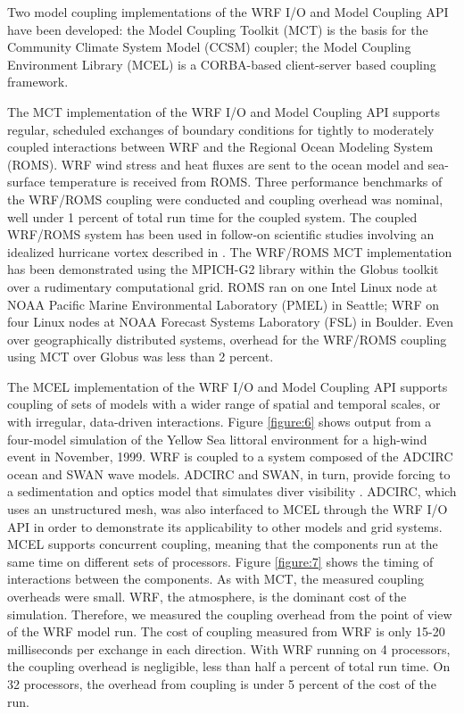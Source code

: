 Two model coupling implementations of the WRF I/O and Model Coupling
API have been developed: the Model Coupling Toolkit (MCT)
\citep{larson01} is the basis for the Community Climate System Model
(CCSM) coupler; the Model Coupling Environment Library (MCEL)
\citep{bettencourt02} is a CORBA-based client-server based coupling
framework.

The MCT implementation of the WRF I/O and Model Coupling API supports
regular, scheduled exchanges of boundary conditions for tightly to
moderately coupled interactions between WRF and the Regional Ocean
Modeling System (ROMS).  WRF wind stress and heat fluxes are sent to
the ocean model and sea-surface temperature is received from ROMS.
Three performance benchmarks of the WRF/ROMS coupling were conducted
and coupling overhead was nominal, well under 1 percent of total run
time for the coupled system. The coupled WRF/ROMS system has been used
in follow-on scientific studies involving an idealized hurricane vortex
described in \citet{nolan02}. The WRF/ROMS MCT implementation has been
demonstrated using the MPICH-G2 library within the Globus toolkit over
a rudimentary computational grid.  ROMS ran on one Intel Linux node at
NOAA Pacific Marine Environmental Laboratory (PMEL) in Seattle; WRF on
four Linux nodes at NOAA Forecast Systems Laboratory (FSL) in Boulder.
Even over geographically distributed systems, overhead for the WRF/ROMS
coupling using MCT over Globus was less than 2 percent.

The MCEL implementation of the WRF I/O and Model Coupling API supports
coupling of sets of models with a wider range of spatial and temporal
scales, or with irregular, data-driven interactions. Figure
\ref{figure:6} shows output from a four-model simulation of the Yellow
Sea littoral environment for a high-wind event in November, 1999. WRF
is coupled to a system composed of the ADCIRC ocean and SWAN wave
models.  ADCIRC and SWAN, in turn, provide forcing to a sedimentation
and optics model that simulates diver visibility \citep{allard02}.
ADCIRC, which uses an unstructured mesh, was also interfaced to MCEL
through the WRF I/O API in order to demonstrate its applicability to
other models and grid systems. MCEL supports concurrent coupling,
meaning that the components run at the same time on different sets of
processors.  Figure \ref{figure:7} shows the timing of interactions
between the components. As with MCT, the measured coupling overheads
were small.  WRF, the atmosphere, is the dominant cost of the
simulation.  Therefore, we measured the coupling overhead from the
point of view of the WRF model run. The cost of coupling measured from
WRF is only 15-20 milliseconds per exchange in each direction. With WRF
running on 4 processors, the coupling overhead is negligible, less than half
a percent of total run time. On 32 processors, the overhead from
coupling is under 5 percent of the cost of the run.

